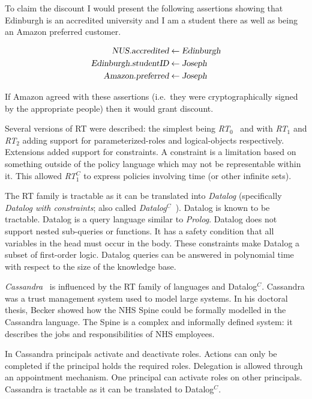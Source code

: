 \documentclass[a4paper]{article}
\begin{document}
To claim the discount I would present the following assertions showing that
Edinburgh is an accredited university and I am a student there as well as being
an Amazon preferred customer.

\begin{align*}
  \textsl{NUS.accredited}      & \gets  \textsl{Edinburgh} \\
  \textsl{Edinburgh.studentID} & \gets  \textsl{Joseph}    \\
  \textsl{Amazon.preferred}    & \gets  \textsl{Joseph}    \\
\end{align*}

If Amazon agreed with these assertions (i.e.\ they were cryptographically signed
by the appropriate people) then it would grant discount.

Several versions of RT were described: the simplest being
\emph{RT$_0$}~\cite{Li:2003tj} and with \emph{RT$_1$} and \emph{RT$_2$} adding
support for parameterized-roles and logical-objects respectively. Extensions
added support for constraints.  A constraint is a limitation based on something
outside of the policy language which may not be representable within it.  This
allowed \emph{RT$_1^C$}\cite{Li:2003ix} to express policies involving time (or
other infinite sets).

The RT family is tractable as it can be translated into
\emph{Datalog} (specifically \emph{Datalog with constraints}; also called
\emph{Datalog$^C$~\cite{Li:2003ix}}).  Datalog is known to be tractable. Datalog is a query
language similar to \emph{Prolog}. Datalog does not support nested sub-queries
or functions. It has a safety condition that all variables in the head must
occur in the body. These constraints make Datalog a subset of first-order logic.
Datalog queries can be answered in polynomial time with respect to the size of
the knowledge base.

\emph{Cassandra}~\cite{Becker:2004fi} is influenced by the RT family of
languages and Datalog$^C$.  Cassandra was a trust management system used to
model large systems.  In his doctoral thesis, Becker showed how the NHS Spine
could be formally modelled in the Cassandra language.  The Spine is a complex
and informally defined system: it describes the jobs and responsibilities of NHS
employees.

In Cassandra principals activate and deactivate roles. Actions can only be completed if the
principal holds the required roles. Delegation is allowed through an
appointment mechanism. One principal can activate roles on other
principals. Cassandra is tractable as it can be translated
to Datalog$^C$.
\end{document}
